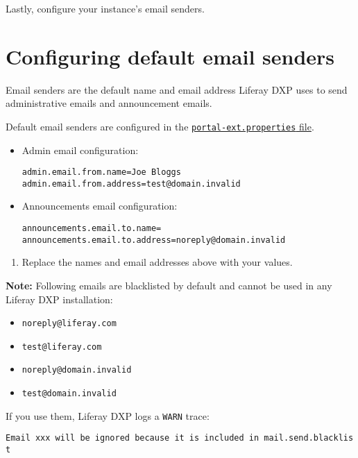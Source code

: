 Lastly, configure your instance's email senders.

\section{Configuring default email
senders}\label{configuring-default-email-senders}

Email senders are the default name and email address Liferay DXP uses to
send administrative emails and announcement emails.

Default email senders are configured in the
\href{/docs/7-2/deploy/-/knowledge_base/d/portal-properties}{\texttt{portal-ext.properties}
file}.

\begin{itemize}
\item
  Admin email configuration:

\begin{verbatim}
admin.email.from.name=Joe Bloggs
admin.email.from.address=test@domain.invalid
\end{verbatim}
\item
  Announcements email configuration:

\begin{verbatim}
announcements.email.to.name=
announcements.email.to.address=noreply@domain.invalid
\end{verbatim}
\end{itemize}

\begin{enumerate}
\def\labelenumi{\arabic{enumi}.}
\tightlist
\item
  Replace the names and email addresses above with your values.
\end{enumerate}

\noindent\hrulefill

\textbf{Note:} Following emails are blacklisted by default and cannot be
used in any Liferay DXP installation:

\begin{itemize}
\tightlist
\item
  \texttt{noreply@liferay.com}
\item
  \texttt{test@liferay.com}
\item
  \texttt{noreply@domain.invalid}
\item
  \texttt{test@domain.invalid}
\end{itemize}

If you use them, Liferay DXP logs a \texttt{WARN} trace:

\texttt{Email\ xxx\ will\ be\ ignored\ because\ it\ is\ included\ in\ mail.send.blacklist}


